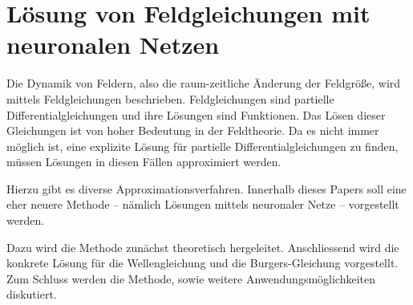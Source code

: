 %
%
%
%
\chapter{Lösung von Feldgleichungen mit neuronalen Netzen\label{chapter:neuronal}}
\begin{refsection}

Die Dynamik von Feldern, also die raum-zeitliche Änderung der Feldgröße, wird mittels Feldgleichungen beschrieben.
Feldgleichungen sind partielle Differentialgleichungen und ihre Lösungen sind Funktionen.
Das Lösen dieser Gleichungen ist von hoher Bedeutung in der Feldtheorie.
Da es nicht immer möglich ist, eine explizite Lösung für partielle Differentialgleichungen zu finden, müssen Lösungen in diesen Fällen approximiert werden.

Hierzu gibt es diverse Approximationsverfahren.
Innerhalb dieses Papers soll eine eher neuere Methode -- nämlich Lösungen mittels neuronaler Netze -- vorgestellt werden.

Dazu wird die Methode zunächst theoretisch hergeleitet.
Anschliessend wird die konkrete Lösung für die Wellengleichung und die Burgers-Gleichung vorgestellt.
Zum Schluss werden die Methode, sowie weitere Anwendungsmöglichkeiten diskutiert.






\printbibliography[heading=subbibliography]
\end{refsection}
